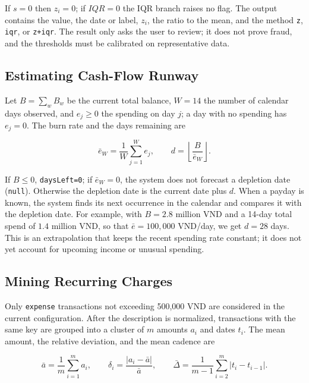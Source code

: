 If $s=0$ then $z_i=0$; if $IQR=0$ the IQR branch raises no flag. The
output contains the value, the date or label, $z_i$, the ratio to the
mean, and the method \texttt{z}, \texttt{iqr}, or \texttt{z+iqr}. The
result only asks the user to review; it does not prove fraud, and the
thresholds must be calibrated on representative data.

\subsection{Estimating Cash-Flow Runway}

Let $B=\sum_w B_w$ be the current total balance, $W=14$ the number of
calendar days observed, and $e_j\geq0$ the spending on day $j$; a day
with no spending has $e_j=0$. The burn rate and the days remaining are

\begin{equation}
  \bar e_W=\frac{1}{W}\sum_{j=1}^{W}e_j,\qquad
  d=\left\lfloor\frac{B}{\bar e_W}\right\rfloor.
\end{equation}

If $B\leq0$, \texttt{daysLeft=0}; if $\bar e_W=0$, the system does not
forecast a depletion date (\texttt{null}). Otherwise the depletion date
is the current date plus $d$. When a payday is known, the system finds
its next occurrence in the calendar and compares it with the depletion
date. For example, with $B=2.8$ million VND and a 14-day total spend of
$1.4$ million VND, so that $\bar e=100{,}000$ VND/day, we get $d=28$
days. This is an extrapolation that keeps the recent spending rate
constant; it does not yet account for upcoming income or unusual
spending.

\subsection{Mining Recurring Charges}

Only \texttt{expense} transactions not exceeding 500,000 VND are
considered in the current configuration. After the description is
normalized, transactions with the same key are grouped into a cluster of
$m$ amounts $a_i$ and dates $t_i$. The mean amount, the relative
deviation, and the mean cadence are

\begin{equation}
  \bar a=\frac{1}{m}\sum_{i=1}^{m}a_i,\qquad
  \delta_i=\frac{|a_i-\bar a|}{\bar a},\qquad
  \bar\Delta=\frac{1}{m-1}\sum_{i=2}^{m}|t_i-t_{i-1}|.
\end{equation}

